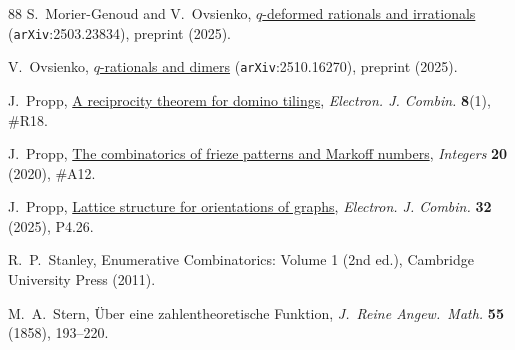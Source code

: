 \documentclass[12pt]{article}
\theoremstyle{plain}
\theoremstyle{definition}
\theoremstyle{remark}
\begin{document}
\begin{thebibliography}{88}
S.~Morier-Genoud and V.~Ovsienko,
\href{https://arxiv.org/html/2503.23834v1}
{$q$-deformed rationals and irrationals}
({\tt arXiv}:2503.23834), preprint (2025).

V.~Ovsienko,
\href{https://arxiv.org/abs/2510.16270}{$q$-rationals and dimers}
({\tt arXiv}:2510.16270), preprint (2025).

J.~Propp,
\href{https://www.combinatorics.org/ojs/index.php/eljc/article/view/v8i1r18}
{A reciprocity theorem for domino tilings},
{\em Electron. J. Combin.} {\bf 8}(1), \#R18.

J.~Propp,
\href{https://math.colgate.edu/~integers/u12/u12.pdf}
{The combinatorics of frieze patterns and Markoff numbers},
{\em Integers} {\bf 20} (2020), \#A12.

J.~Propp,
\href{https://www.combinatorics.org/ojs/index.php/eljc/article/view/v32i4p26}
{Lattice structure for orientations of graphs},
{\em Electron. J. Combin.} {\bf 32} (2025), P4.26.

R.~P.~Stanley, Enumerative Combinatorics: Volume 1 (2nd ed.), 
Cambridge University Press (2011).

M.~A.~Stern, 
\"Uber eine zahlentheoretische Funktion, 
{\em J.\ Reine Angew.\ Math.} {\bf 55} (1858), 193--220.

\end{thebibliography}
\end{document}
